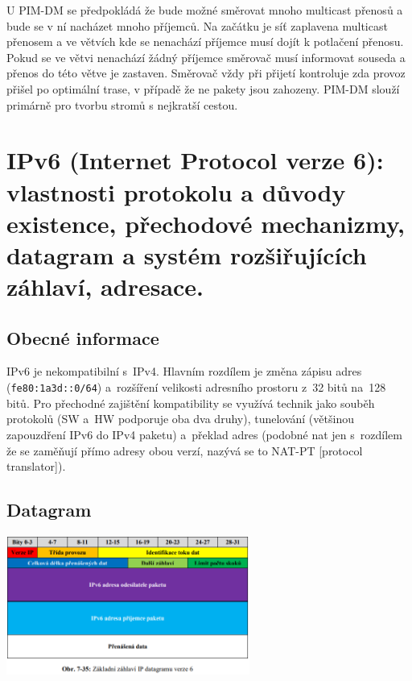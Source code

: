 U PIM-DM se předpokládá že bude možné směrovat mnoho multicast přenosů a bude se v ní nacházet mnoho příjemců.
Na začátku je síť zaplavena multicast přenosem a ve větvích kde se nenachází příjemce musí dojít k potlačení přenosu.
Pokud se ve větvi nenachází žádný příjemce směrovač musí informovat souseda a přenos do této větve je zastaven.
Směrovač vždy při přijetí kontroluje zda provoz přišel po optimální trase, v případě že ne pakety jsou zahozeny.
PIM-DM slouží primárně pro tvorbu stromů s nejkratší cestou.


\clearpage
\section{IPv6 (Internet Protocol verze 6): vlastnosti protokolu a důvody existence, přechodové mechanizmy, datagram a systém rozšiřujících záhlaví, adresace.}

\subsection{Obecné informace}

IPv6 je nekompatibilní s~IPv4.
Hlavním rozdílem je změna zápisu adres (\texttt{fe80:1a3d::0/64}) a~rozšíření velikosti adresního prostoru z~32 bitů na~128 bitů.
Pro přechodné zajištění kompatibility se využívá technik jako souběh protokolů (SW a~HW podporuje oba dva druhy), tunelování (většinou zapouzdření IPv6 do IPv4 paketu) a~překlad adres (podobné nat jen s~rozdílem že se zaměňují přímo adresy obou verzí, nazývá se to NAT-PT [protocol translator]).


\subsection{Datagram}
\begin{center}
	\includegraphics[width=0.6\textwidth]{obrazky/070.png}
\end{center}

